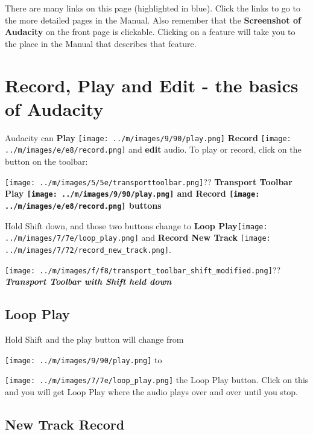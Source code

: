 \documentclass[twocolumn]{book}
\begin{document}
There are many links on this page (highlighted in blue). Click the links to go to the more detailed pages in the Manual. 
Also remember that the \textbf{Screenshot of Audacity} on the front page is clickable.  Clicking on a feature will take you to the place in the Manual that describes that feature. 



\section{Record, Play and Edit - the basics of Audacity}


Audacity can \textbf{Play} \texttt{[image: ../m/images/9/90/play.png]} \textbf{Record} \texttt{[image: ../m/images/e/e8/record.png]} and  \textbf{edit} audio.  To play or record, click on the button on the toolbar:\par\texttt{[image: ../m/images/5/5e/transporttoolbar.png]}??
\textbf{Transport Toolbar Play \texttt{[image: ../m/images/9/90/play.png]} and Record \texttt{[image: ../m/images/e/e8/record.png]} buttons}


Hold Shift down, and those two buttons change to \textbf{Loop Play}\texttt{[image: ../m/images/7/7e/loop\_play.png]} and \textbf{Record New Track} \texttt{[image: ../m/images/7/72/record\_new\_track.png]}.\par\texttt{[image: ../m/images/f/f8/transport\_toolbar\_shift\_modified.png]}??
\textit{\textbf{Transport Toolbar with Shift held down}}

\subsection{Loop Play}


Hold Shift and the play button will change from \par\texttt{[image: ../m/images/9/90/play.png]} to \par\texttt{[image: ../m/images/7/7e/loop\_play.png]} the Loop Play button. Click on this and you will get Loop Play where the audio plays over and over until you stop.  

\subsection{New Track Record}
\end{document}
